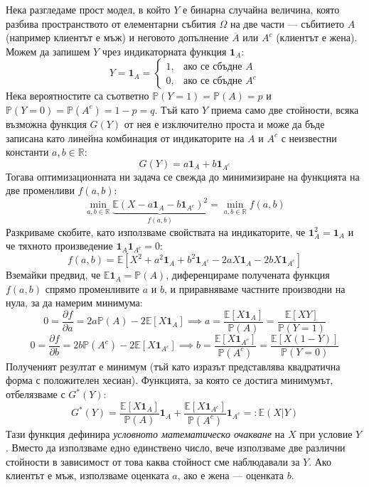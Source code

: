 \documentclass{article}
\begin{document}
Нека разгледаме прост модел, в който $Y$ е бинарна случайна величина, която разбива пространството от елементарни събития $\Omega$ на две части — събитието $A$ (например клиентът е мъж) и неговото допълнение $\overline{A}$ или $A^c$ (клиентът е жена). Можем да запишем $Y$ чрез индикаторната функция $\mathbf{1}_A$:
\[
Y = \mathbf{1}_A = \begin{cases} 
1, & \text{ако се сбъдне } A \\ 
0, & \text{ако се сбъдне } A^c 
\end{cases}
\]
Нека вероятностите са съответно $\mathbb{P}(Y=1) = \mathbb{P}(A) = p$ и $\mathbb{P}(Y=0) = \mathbb{P}(A^c) = 1-p = q$. Тъй като $Y$ приема само две стойности, всяка възможна функция $G(Y)$ от нея е изключително проста и може да бъде записана като линейна комбинация от индикаторите на $A$ и $A^c$ с неизвестни константи $a, b \in \mathbb{R}$:
\[
G(Y) = a \mathbf{1}_A + b \mathbf{1}_{A^c}
\]
Тогава оптимизационната ни задача се свежда до минимизиране на функцията на две променливи $f(a, b)$:
\[
\min_{a, b \in \mathbb{R}} \underbrace{\mathbb{E}(X - a \mathbf{1}_A - b \mathbf{1}_{A^c})^2}_{f(a,b)} = \min_{a, b \in \mathbb{R}} f(a,b)
\]
Разкриваме скобите, като използваме свойствата на индикаторите, че $\mathbf{1}_A^2 = \mathbf{1}_A$ и че тяхното произведение $\mathbf{1}_A \mathbf{1}_{A^c} = 0$:
\[
f(a,b) = \mathbb{E}[X^2 + a^2 \mathbf{1}_A + b^2 \mathbf{1}_{A^c} - 2aX\mathbf{1}_A - 2bX\mathbf{1}_{A^c}]
\]
Вземайки предвид, че $\mathbb{E}\mathbf{1}_A = \mathbb{P}(A)$, диференцираме получената функция $f(a,b)$ спрямо променливите $a$ и $b$, и приравняваме частните производни на нула, за да намерим минимума:
\[
0 = \frac{\partial f}{\partial a} = 2a\mathbb{P}(A) - 2\mathbb{E}[X\mathbf{1}_A] \implies a = \frac{\mathbb{E}[X\mathbf{1}_A]}{\mathbb{P}(A)} = \frac{\mathbb{E}[XY]}{\mathbb{P}(Y=1)}
\]
\[
0 = \frac{\partial f}{\partial b} = 2b\mathbb{P}(A^c) - 2\mathbb{E}[X\mathbf{1}_{A^c}] \implies b = \frac{\mathbb{E}[X\mathbf{1}_{A^c}]}{\mathbb{P}(A^c)} = \frac{\mathbb{E}[X(1-Y)]}{\mathbb{P}(Y=0)}
\]
Полученият резултат е минимум (тъй като изразът представлява квадратична форма с положителен хесиан). Функцията, за която се достига минимумът, отбелязваме с $G^*(Y)$:
\[
G^*(Y) = \frac{\mathbb{E}[X\mathbf{1}_A]}{\mathbb{P}(A)} \mathbf{1}_A + \frac{\mathbb{E}[X\mathbf{1}_{A^c}]}{\mathbb{P}(A^c)} \mathbf{1}_{A^c} =: \mathbb{E}(X|Y)
\]
Тази функция дефинира \emph{условното математическо очакване} на $X$ при условие $Y$. Вместо да използваме едно единствено число, вече използваме две различни стойности в зависимост от това каква стойност сме наблюдавали за $Y$. Ако клиентът е мъж, използваме оценката $a$, ако е жена — оценката $b$.
\end{document}
